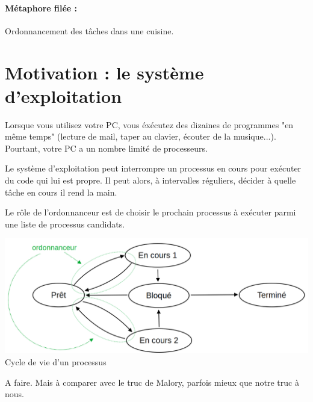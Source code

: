 
\paragraph{Métaphore filée :} Ordonnancement des tâches dans une cuisine.

\section{Motivation : le système d'exploitation}

\begin{rem}
	Lorsque vous utilisez votre PC, vous éxécutez des dizaines de programmes "en même temps" (lecture de mail, taper au clavier, écouter de la musique...). Pourtant, votre PC a un nombre limité de processeurs.
\end{rem}

\begin{definition}
	Le système d'exploitation peut interrompre un processus en cours pour exécuter du code qui lui est propre. Il peut alors, à intervalles réguliers, décider à quelle tâche en cours il rend la main. 
	
	Le rôle de l'ordonnanceur est de choisir le prochain processus à exécuter parmi une liste de processus candidats. 
\end{definition}

%	
%	
%	
%	

\begin{center}
	\includegraphics[width=0.9\linewidth]{lecon/17-ordonnancement/graphe_etat.png}\\
	Cycle de vie d'un processus
\end{center}

\begin{com}
	A faire. Mais à comparer avec le truc de Malory, parfois mieux que notre truc à nous.
\end{com}